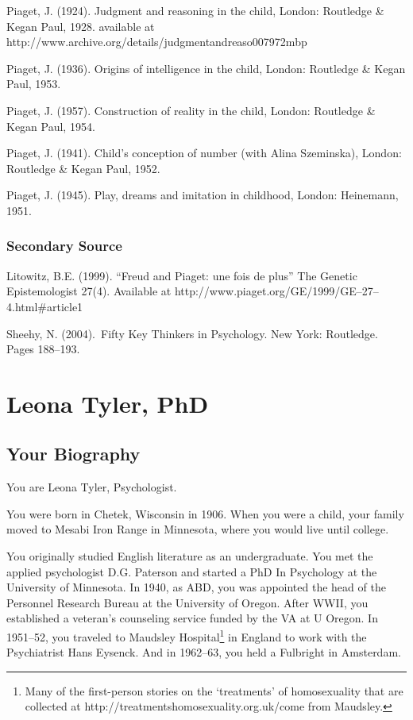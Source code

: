 Piaget, J. (1924). Judgment and reasoning in the child, London: Routledge \& Kegan Paul, 1928. available at http:\slash \slash www.archive.org\slash details\slash judgmentandreaso007972mbp

Piaget, J. (1936). Origins of intelligence in the child, London: Routledge \& Kegan Paul, 1953.

Piaget, J. (1957). Construction of reality in the child, London: Routledge \& Kegan Paul, 1954.

Piaget, J. (1941). Child's conception of number (with Alina Szeminska), London: Routledge \& Kegan Paul, 1952.

Piaget, J. (1945). Play, dreams and imitation in childhood, London: Heinemann, 1951.

\subsection{Secondary Source}
\label{secondarysource}

Litowitz, B.E. (1999). ``Freud and Piaget: une fois de plus'' The Genetic Epistemologist 27(4). Available at http:\slash \slash www.piaget.org\slash GE\slash 1999\slash GE--27--4.html\#article1

Sheehy, N. (2004). Fifty Key Thinkers in Psychology. New York: Routledge. Pages 188--193.

\chapter{Leona Tyler, PhD}
\label{leonatylerphd}

\section{Your Biography}
\label{yourbiography}

You are Leona Tyler, Psychologist.

You were born in Chetek, Wisconsin in 1906. When you were a child, your family moved to Mesabi Iron Range in Minnesota, where you would live until college.

You originally studied English literature as an undergraduate. You met the applied psychologist D.G. Paterson and started a PhD In Psychology at the University of Minnesota. In 1940, as ABD, you was appointed the head of the Personnel Research Bureau at the University of Oregon. After WWII, you established a veteran's counseling service funded by the VA at U Oregon. In 1951--52, you traveled to Maudsley Hospital\footnote{Many of the first-person stories on the `treatments' of homosexuality that are collected at http:\slash \slash treatmentshomosexuality.org.uk\slash  come from Maudsley.} in England to work with the Psychiatrist Hans Eysenck. And in 1962--63, you held a Fulbright in Amsterdam.

